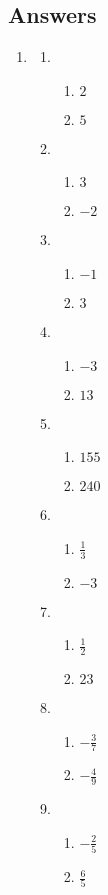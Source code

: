 \documentclass[a4paper,12pt]{article}
\begin{document}
\newpage
\subsection*{Answers}

\begin{enumerate}
\item
    \begin{multicols}{2}
    \begin{enumerate}
    \item
        \begin{enumerate}
        \item $2$
        \item $5$
        \end{enumerate}
    \item
        \begin{enumerate}
        \item $3$
        \item $-2$
        \end{enumerate}
    \item
        \begin{enumerate}
        \item $-1$
        \item $3$
        \end{enumerate}
    \item
        \begin{enumerate}
        \item $-3$
        \item $13$
        \end{enumerate}
    \item
        \begin{enumerate}
        \item $155$
        \item $240$
        \end{enumerate}
    \item
        \begin{enumerate}
        \item $\frac{1}{3}$
        \item $-3$
        \end{enumerate}
    \item
        \begin{enumerate}
        \item $\frac{1}{2}$
        \item $23$
        \end{enumerate}
    \item
        \begin{enumerate}
        \item $-\frac{3}{7}$
        \item $-\frac{4}{9}$
        \end{enumerate}
    \item
        \begin{enumerate}
        \item $-\frac{2}{5}$
        \item $\frac{6}{5}$
        \end{enumerate}
    \end{enumerate}
    \end{multicols}


\end{enumerate}
\end{document}
